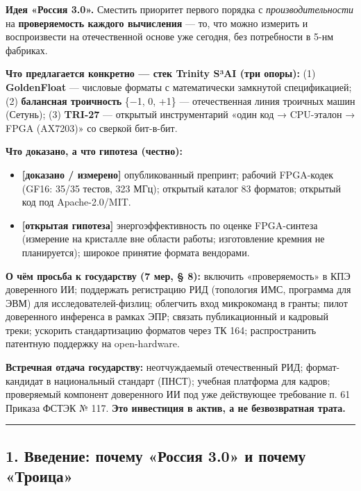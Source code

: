 \documentclass[
  russian,
]{article}
\providecommand{\tightlist}{%
  \setlength{\itemsep}{0pt}\setlength{\parskip}{0pt}}
\begin{document}
\textbf{Идея «Россия 3.0».} Сместить приоритет первого порядка с
\emph{производительности} на \textbf{проверяемость каждого вычисления}
--- то, что можно измерить и воспроизвести на отечественной основе уже
сегодня, без потребности в 5-нм фабриках.

\textbf{Что предлагается конкретно --- стек Trinity S³AI (три опоры):}
(1) \textbf{GoldenFloat} --- числовые форматы с математически замкнутой
спецификацией; (2) \textbf{балансная троичность} \{−1, 0, +1\} ---
отечественная линия троичных машин (Сетунь); (3) \textbf{TRI-27} ---
открытый инструментарий «один код → CPU-эталон → FPGA (AX7203)» со
сверкой бит-в-бит.

\textbf{Что доказано, а что гипотеза (честно):}

\begin{itemize}
\tightlist
\item
  \textbf{{[}доказано / измерено{]}} опубликованный препринт; рабочий
  FPGA-кодек (GF16: 35/35 тестов, 323 МГц); открытый каталог 83
  форматов; открытый код под Apache-2.0/MIT.
\item
  \textbf{{[}открытая гипотеза{]}} энергоэффективность по оценке FPGA-синтеза
  (измерение на кристалле вне области работы; изготовление кремния не планируется); широкое
  принятие формата вендорами.
\end{itemize}

\textbf{О чём просьба к государству (7 мер, § 8):} включить
«проверяемость» в КПЭ доверенного ИИ; поддержать регистрацию РИД
(топология ИМС, программа для ЭВМ) для исследователей-физлиц; облегчить
вход микрокоманд в гранты; пилот доверенного инференса в рамках ЭПР;
связать публикационный и кадровый треки; ускорить стандартизацию
форматов через ТК 164; распространить патентную поддержку на
open-hardware.

\textbf{Встречная отдача государству:} неотчуждаемый отечественный РИД;
формат-кандидат в национальный стандарт (ПНСТ); учебная платформа для
кадров; проверяемый компонент доверенного ИИ под уже действующее
требование п. 61 Приказа ФСТЭК № 117. \textbf{Это инвестиция в актив, а
не безвозвратная трата.}

\begin{center}\rule{0.5\linewidth}{0.5pt}\end{center}

\subsection{1. Введение: почему «Россия 3.0» и почему
«Троица»}\label{ux432ux432ux435ux434ux435ux43dux438ux435-ux43fux43eux447ux435ux43cux443-ux440ux43eux441ux441ux438ux44f-3.0-ux438-ux43fux43eux447ux435ux43cux443-ux442ux440ux43eux438ux446ux430}
\end{document}
